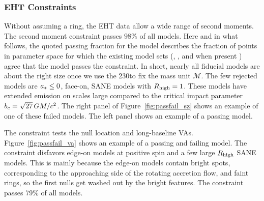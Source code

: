 \subsubsection{EHT Constraints}\label{sec:constraints}


Without assuming a ring, the EHT data allow a wide range of second moments.
The second moment constraint passes $98\%$ of all models.  Here and in what follows, the quoted passing fraction for the model describes the fraction of points in parameter space for which the existing model sets (\kharma, \bhac, and when present \hamr) agree that the model passes the constraint.
In short, nearly all fiducial models are about the right size once we use the 230\GHz to fix the mass unit $\mathcal{M}$.
The few rejected models are $a_* \le 0$, face-on, SANE models with $R_\mathrm{high} = 1$.
These models have extended emission on scales large compared to the critical impact parameter $b_c = \sqrt{27}\,GM/c^2$.
The right panel of Figure~\ref{fig:passfail_sz} shows an example of one of these failed models.  The left panel shows an example of a passing model.

\label{sec:vam}

The \vam constraint tests the null location and long-baseline VAs.  Figure~\ref{fig:passfail_va} shows an example of a passing and failing model.
The constraint disfavors edge-on models at positive spin and a few large $R_\mathrm{high}$ SANE models.
This is mainly because the edge-on models contain bright spots, corresponding to the approaching side of the rotating accretion flow, and faint rings, so the first nulls get washed out by the bright features.
The \vam constraint passes 79\% of all models.


